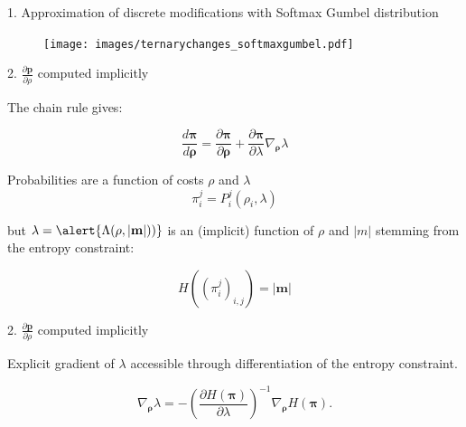 \documentclass[10pt]{beamer}
\begin{document}
\begin{frame}{1. Approximation of discrete modifications with Softmax Gumbel distribution}
    \begin{figure}[h]
        \texttt{[image: images/ternarychanges\_softmaxgumbel.pdf]}
    \end{figure}
\end{frame}



\begin{frame}{2. $\frac{\partial \mathbf{p}}{\partial \rho}$ computed implicitly}

The chain rule gives:

\begin{equation}
\frac{d \bm{\pi}}{d \bm{\rho}} = \frac{\partial \bm{\pi}}{\partial \bm{\rho}} + \frac{\partial \bm{\pi}}{\partial \lambda} \nabla_{\bm{\rho}} \lambda
\label{eq:gradientprobabilities}
\end{equation}

\pause

    Probabilities are a function of costs $\rho$ and $\lambda$
    \begin{equation}
        \pi_i^j = P_i^j\left(\rho_{i}, \lambda\right)%
    \end{equation}
    
    \pause
    
    but $\lambda = \alert{\Lambda(\rho,|\mathbf{m}|))}$ is an (implicit) function of $\rho$ and $|m|$ stemming from the entropy constraint:
    
    \begin{equation}
        H\left(\left(\pi_i^j\right)_{i,j}\right)=|\mathbf{m}|
    \end{equation}
    
    \pause

\end{frame}

\begin{frame}{2. $\frac{\partial \mathbf{p}}{\partial \rho}$ computed implicitly}

Explicit gradient of $\lambda$ accessible through differentiation of the entropy constraint.

    \begin{equation}
    \nabla_{\bm{\rho}} \lambda =  -\left( \frac{\partial  H(\bm{\pi})}{\partial \lambda}\right)^{-1} \nabla_{\bm{\rho}} H (\bm{\pi}) .
\label{eq:gradientimplicit}
\end{equation}
\end{frame}
\end{document}

